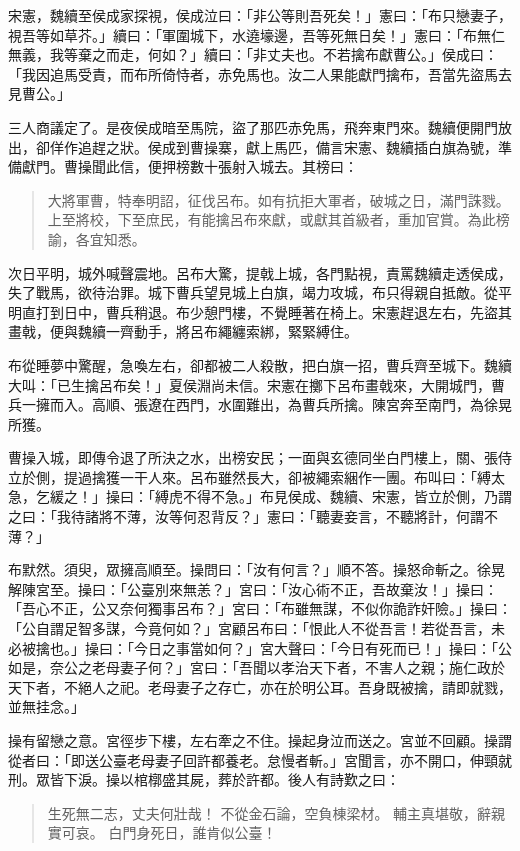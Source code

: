 宋憲，魏續至侯成家探視，侯成泣曰：「非公等則吾死矣！」憲曰：「布只戀妻子，視吾等如草芥。」續曰：「軍圍城下，水遶壕邊，吾等死無日矣！」憲曰：「布無仁無義，我等棄之而走，何如？」續曰：「非丈夫也。不若擒布獻曹公。」侯成曰：「我因追馬受責，而布所倚恃者，赤免馬也。汝二人果能獻門擒布，吾當先盜馬去見曹公。」

三人商議定了。是夜侯成暗至馬院，盜了那匹赤免馬，飛奔東門來。魏續便開門放出，卻佯作追趕之狀。侯成到曹操寨，獻上馬匹，備言宋憲、魏續插白旗為號，準備獻門。曹操聞此信，便押榜數十張射入城去。其榜曰：

\begin{quote}
大將軍曹，特奉明詔，征伐呂布。如有抗拒大軍者，破城之日，滿門誅戮。上至將校，下至庶民，有能擒呂布來獻，或獻其首級者，重加官賞。為此榜諭，各宜知悉。
\end{quote}

次日平明，城外喊聲震地。呂布大驚，提戟上城，各門點視，責罵魏續走透侯成，失了戰馬，欲待治罪。城下曹兵望見城上白旗，竭力攻城，布只得親自抵敵。從平明直打到日中，曹兵稍退。布少憩門樓，不覺睡著在椅上。宋憲趕退左右，先盜其畫戟，便與魏續一齊動手，將呂布繩纏索綁，緊緊縛住。

布從睡夢中驚醒，急喚左右，卻都被二人殺散，把白旗一招，曹兵齊至城下。魏續大叫：「已生擒呂布矣！」夏侯淵尚未信。宋憲在擲下呂布畫戟來，大開城門，曹兵一擁而入。高順、張遼在西門，水圍難出，為曹兵所擒。陳宮奔至南門，為徐晃所獲。

曹操入城，即傳令退了所決之水，出榜安民；一面與玄德同坐白門樓上，關、張侍立於側，提過擒獲一干人來。呂布雖然長大，卻被繩索綑作一團。布叫曰：「縛太急，乞緩之！」操曰：「縛虎不得不急。」布見侯成、魏續、宋憲，皆立於側，乃謂之曰：「我待諸將不薄，汝等何忍背反？」憲曰：「聽妻妾言，不聽將計，何謂不薄？」

布默然。須臾，眾擁高順至。操問曰：「汝有何言？」順不答。操怒命斬之。徐晃解陳宮至。操曰：「公臺別來無恙？」宮曰：「汝心術不正，吾故棄汝！」操曰：「吾心不正，公又奈何獨事呂布？」宮曰：「布雖無謀，不似你詭詐奸險。」操曰：「公自謂足智多謀，今竟何如？」宮顧呂布曰：「恨此人不從吾言！若從吾言，未必被擒也。」操曰：「今日之事當如何？」宮大聲曰：「今日有死而已！」操曰：「公如是，奈公之老母妻子何？」宮曰：「吾聞以孝治天下者，不害人之親；施仁政於天下者，不絕人之祀。老母妻子之存亡，亦在於明公耳。吾身既被擒，請即就戮，並無挂念。」

操有留戀之意。宮徑步下樓，左右牽之不住。操起身泣而送之。宮並不回顧。操謂從者曰：「即送公臺老母妻子回許都養老。怠慢者斬。」宮聞言，亦不開口，伸頸就刑。眾皆下淚。操以棺槨盛其屍，葬於許都。後人有詩歎之曰：

\begin{quote}
生死無二志，丈夫何壯哉！
不從金石論，空負棟梁材。
輔主真堪敬，辭親實可哀。
白門身死日，誰肯似公臺！
\end{quote}

